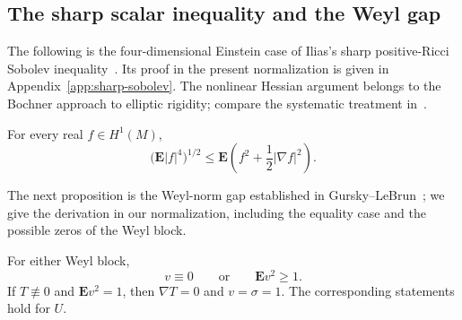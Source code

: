 \subsection{The sharp scalar inequality and the Weyl gap}

The following is the four-dimensional Einstein case of Ilias's sharp
positive-Ricci Sobolev inequality~\cite[Theorem~3]{Ilias}. Its proof in
the present normalization is given in Appendix~\ref{app:sharp-sobolev}.
The nonlinear Hessian argument
belongs to the Bochner approach to elliptic rigidity; compare the
systematic treatment in~\cite{BidautVeronVeron}.

\begin{proposition}
\label{prop:sharp-sobolev}
For every real $f\in H^1(M)$,
\[
 \bigl(\mathbf E|f|^4\bigr)^{1/2}
 \le\mathbf E\left(f^2+\frac12|\nabla f|^2\right).
\]
\end{proposition}

The next proposition is the Weyl-norm gap established in
Gursky--LeBrun~\cite[Theorem~1]{GurskyLeBrun1999}; we give the derivation in
our normalization, including the equality case and the possible
zeros of the Weyl block.

\begin{proposition}
\label{prop:weyl-gap}
For either Weyl block,
\begin{equation}
 v\equiv0\qquad\text{or}\qquad \mathbf E v^2\ge1.
 \tag{5}\label{eq:5}
\end{equation}
If $T\not\equiv0$ and $\mathbf E v^2=1$, then
$\nabla T=0$ and $v=\sigma=1$. The corresponding statements hold
for $U$.
\end{proposition}

